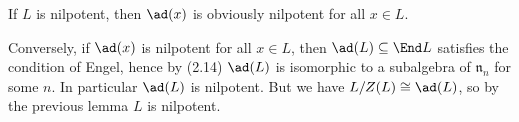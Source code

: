 If $L$ is nilpotent, then $\ad(x)$ is obviously nilpotent for all $x \in L$.

Conversely, if $\ad(x)$ is nilpotent for all $x \in L$, then $\ad(L) \subseteq \End L$
satisfies the condition of Engel, hence by (2.14) $\ad(L)$ is isomorphic to a subalgebra of
$\mathfrak{n}_n$ for some $n$. In particular $\ad(L)$ is nilpotent. But we
have $L/Z(L)\cong \ad(L)$, so by the previous lemma $L$ is nilpotent.
